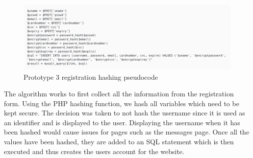  \begin{figure}[H]
     \centering
     \includegraphics[scale=0.2]{ch3_developing/proto3/register_hash.png}
     \caption{Prototype 3 registration hashing pseudocode}
     \label{fig:proto3_hasingalg}
 \end{figure}
The algorithm works to first collect all the information from the registration form. Using the PHP hashing function, we hash all variables which need to be kept secure. The decision was taken to not hash the username since it is used as an identifier and is displayed to the user. Displaying the username when it has been hashed would cause issues for pages such as the messages page.  Once all the values have been hashed, they are added to an SQL statement which is then executed and thus creates the users account for the website. 
